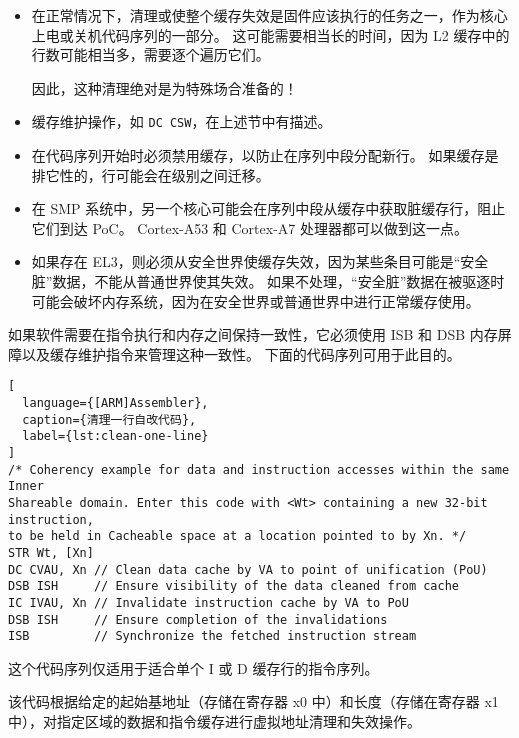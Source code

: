 \begin{itemize}
  \item 在正常情况下，清理或使整个缓存失效是固件应该执行的任务之一，作为核心上电或关机代码序列的一部分。
  这可能需要相当长的时间，因为 L2 缓存中的行数可能相当多，需要逐个遍历它们。

    因此，这种清理绝对是为特殊场合准备的！
  \item 缓存维护操作，如 \lstinline!DC CSW!，在上述节中有描述。
  \item 在代码序列开始时必须禁用缓存，以防止在序列中段分配新行。
  如果缓存是排它性的，行可能会在级别之间迁移。
  \item 在 SMP 系统中，另一个核心可能会在序列中段从缓存中获取脏缓存行，阻止它们到达 PoC。
  Cortex-A53 和 Cortex-A7 处理器都可以做到这一点。
  \item 如果存在 EL3，则必须从安全世界使缓存失效，因为某些条目可能是“安全脏”数据，不能从普通世界使其失效。
  如果不处理，“安全脏”数据在被驱逐时可能会破坏内存系统，因为在安全世界或普通世界中进行正常缓存使用。
\end{itemize}

如果软件需要在指令执行和内存之间保持一致性，它必须使用 ISB 和 DSB 内存屏障以及缓存维护指令来管理这种一致性。
下面的代码序列可用于此目的。

\begin{lstlisting}[
  language={[ARM]Assembler},
  caption={清理一行自改代码},
  label={lst:clean-one-line}
]
/* Coherency example for data and instruction accesses within the same Inner
Shareable domain. Enter this code with <Wt> containing a new 32-bit instruction,
to be held in Cacheable space at a location pointed to by Xn. */
STR Wt, [Xn]
DC CVAU, Xn // Clean data cache by VA to point of unification (PoU)
DSB ISH     // Ensure visibility of the data cleaned from cache
IC IVAU, Xn // Invalidate instruction cache by VA to PoU
DSB ISH     // Ensure completion of the invalidations
ISB         // Synchronize the fetched instruction stream
\end{lstlisting}

这个代码序列仅适用于适合单个 I 或 D 缓存行的指令序列。

该代码根据给定的起始基地址（存储在寄存器 x0 中）和长度（存储在寄存器 x1 中），对指定区域的数据和指令缓存进行虚拟地址清理和失效操作。

